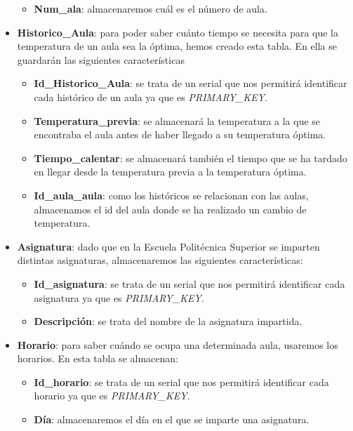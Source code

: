 \documentclass[12pt]{report}
\begin{document}
\begin{itemize}
\begin{itemize}
        \item \textbf{Num\_ala}: almacenaremos cuál es el número de aula.
        \\
    \end{itemize} 
    \item  \textbf{Historico\_Aula}: para poder saber cuánto tiempo se necesita para que la temperatura de un aula sea la óptima, hemos creado esta tabla. En ella se guardarán las siguientes características
    \begin{itemize}
        \item\textbf{Id\_Historico\_Aula}: se trata de un serial que nos permitirá identificar cada histórico de un aula ya que es \textit{PRIMARY\_KEY}.
        \item \textbf{Temperatura\_previa}: se almacenará la temperatura a la que se encontraba el aula antes de haber llegado a su temperatura óptima.
        \item \textbf{Tiempo\_calentar}: se almacenará también el tiempo que se ha tardado en llegar desde la temperatura previa a la temperatura óptima.
        \item \textbf{Id\_aula\_aula}: como los históricos se relacionan con las aulas, almacenamos el id del aula donde se ha realizado un cambio de temperatura.
        \\
    \end{itemize} 
    \item  \textbf{Asignatura}: dado que en la Escuela Politécnica Superior se imparten distintas asignaturas, almacenaremos las siguientes características:
    \begin{itemize}
        \item\textbf{Id\_asignatura}: se trata de un serial que nos permitirá identificar cada asignatura ya que es \textit{PRIMARY\_KEY}.
        \item \textbf{Descripción}: se trata del nombre de la asignatura impartida.
        \\
    \end{itemize} 
    \item  \textbf{Horario}: para saber cuándo se ocupa una determinada aula, usaremos los horarios. En esta tabla se almacenan:
    \begin{itemize}
        \item\textbf{Id\_horario}: se trata de un serial que nos permitirá identificar cada horario ya que es \textit{PRIMARY\_KEY}.
        \item \textbf{Día}: almacenaremos el día en el que se imparte una asignatura.

\end{itemize}
\end{itemize}
\end{document}
